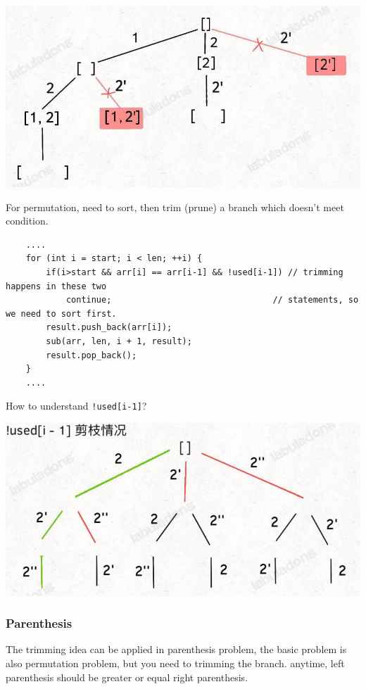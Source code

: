 \documentclass[a4paper,11pt,twoside]{book}
\begin{document}
\begin{center}
	\includegraphics[width=0.5\linewidth]{pics/com_duplicate}
\end{center}
	

	\par For permutation, need to sort, then trim (prune) a branch which doesn't meet condition. 
\begin{lstlisting}
	....
	for (int i = start; i < len; ++i) {
		if(i>start && arr[i] == arr[i-1] && !used[i-1]) // trimming happens in these two 
			continue;                                // statements, so we need to sort first. 
		result.push_back(arr[i]);  
		sub(arr, len, i + 1, result);
		result.pop_back();
	}	
	....
\end{lstlisting}

	\par How to understand \verb|!used[i-1]|? 
	\begin{center}
		\includegraphics[width=0.5\linewidth]{pics/per_duplicate}
	\end{center}
	


\subsubsection{Parenthesis}

	\par The trimming idea can be applied in parenthesis problem, the basic problem is also permutation problem, but you need to trimming the branch. 
	anytime, left parenthesis should be greater or equal right parenthesis. 
	
\end{document}
